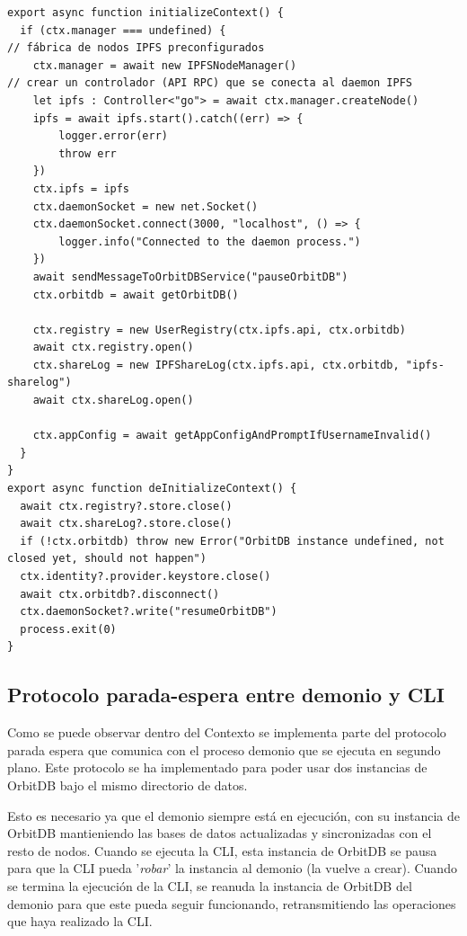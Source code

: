 \begin{verbatim}
export async function initializeContext() {
  if (ctx.manager === undefined) {
// fábrica de nodos IPFS preconfigurados
    ctx.manager = await new IPFSNodeManager()
// crear un controlador (API RPC) que se conecta al daemon IPFS
    let ipfs : Controller<"go"> = await ctx.manager.createNode()
    ipfs = await ipfs.start().catch((err) => {
        logger.error(err)
        throw err
    })
    ctx.ipfs = ipfs
    ctx.daemonSocket = new net.Socket()
    ctx.daemonSocket.connect(3000, "localhost", () => {
        logger.info("Connected to the daemon process.") 
    })
    await sendMessageToOrbitDBService("pauseOrbitDB")
    ctx.orbitdb = await getOrbitDB()
    
    ctx.registry = new UserRegistry(ctx.ipfs.api, ctx.orbitdb)
    await ctx.registry.open()
    ctx.shareLog = new IPFShareLog(ctx.ipfs.api, ctx.orbitdb, "ipfs-sharelog")
    await ctx.shareLog.open()
    
    ctx.appConfig = await getAppConfigAndPromptIfUsernameInvalid()
  }
}
export async function deInitializeContext() {
  await ctx.registry?.store.close()
  await ctx.shareLog?.store.close()
  if (!ctx.orbitdb) throw new Error("OrbitDB instance undefined, not closed yet, should not happen")
  ctx.identity?.provider.keystore.close()
  await ctx.orbitdb?.disconnect()
  ctx.daemonSocket?.write("resumeOrbitDB")
  process.exit(0)
}
\end{verbatim}

\subsection{Protocolo parada-espera entre demonio y CLI}

Como se puede observar dentro del Contexto se implementa parte del protocolo parada espera
que comunica con el proceso demonio que se ejecuta en segundo plano. Este protocolo se ha implementado
para poder usar dos instancias de OrbitDB bajo el mismo directorio de datos.

Esto es necesario ya que el demonio siempre está en ejecución, con su instancia de OrbitDB mantieniendo las
bases de datos actualizadas y sincronizadas con el resto de nodos. Cuando se ejecuta la CLI, esta instancia de OrbitDB se pausa para que la CLI pueda
'\textit{robar}' la instancia al demonio (la vuelve a crear). Cuando se termina la ejecución de la CLI, se reanuda la instancia de OrbitDB del demonio para que este pueda seguir funcionando, retransmitiendo las operaciones que haya realizado la CLI.

